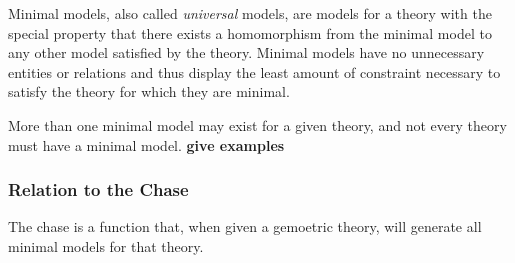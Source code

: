 			Minimal models, also called \emph{universal} models, are models for a
			theory with the special property that there exists a homomorphism from
			the minimal model to any other model satisfied by the theory. Minimal
			models have no unnecessary entities or relations and thus display the
			least amount of constraint necessary to satisfy the theory for which
			they are minimal.

			More than one minimal model may exist for a given theory, and not every
			theory must have a minimal model. \textbf{give examples}

		\subsubsection{Relation to the Chase}

			The chase is a function that, when given a gemoetric theory, will
			generate all minimal models for that theory.
